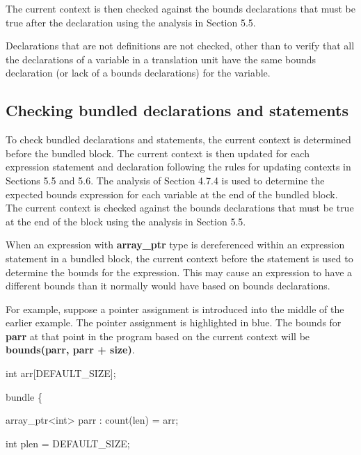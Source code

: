 \documentclass[]{article}
\begin{document}
The current context is then checked against the bounds declarations that
must be true after the declaration using the analysis in Section 5.5.

Declarations that are not definitions are not checked, other than to
verify that all the declarations of a variable in a translation unit
have the same bounds declaration (or lack of a bounds declarations) for
the variable.

\subsection{\texorpdfstring{\protect\hypertarget{ux5fToc426641087}{}{\protect\hypertarget{ux5fToc435434962}{}{\protect\hypertarget{ux5fToc437460790}{}{\protect\hypertarget{ux5fToc440445471}{}{\protect\hypertarget{ux5fToc440449253}{}{\protect\hypertarget{ux5fToc440551903}{}{}}}}}}Checking
bundled declarations and
statements}{Checking bundled declarations and statements}}\label{checking-bundled-declarations-and-statements}

To check bundled declarations and statements, the current context is
determined before the bundled block. The current context is then updated
for each expression statement and declaration following the rules for
updating contexts in Sections 5.5 and 5.6. The analysis of Section 4.7.4
is used to determine the expected bounds expression for each variable at
the end of the bundled block. The current context is checked against the
bounds declarations that must be true at the end of the block using the
analysis in Section 5.5.

When an expression with \textbf{array\_ptr} type is dereferenced within
an expression statement in a bundled block, the current context before
the statement is used to determine the bounds for the expression. This
may cause an expression to have a different bounds than it normally
would have based on bounds declarations.

For example, suppose a pointer assignment is introduced into the middle
of the earlier example. The pointer assignment is highlighted in blue.
The bounds for \textbf{parr} at that point in the program based on the
current context will be \textbf{bounds(parr, parr + size)}.

int arr{[}DEFAULT\_SIZE{]};

bundle \{

array\_ptr\textless{}int\textgreater{} parr : count(len) = arr;

int plen = DEFAULT\_SIZE;
\end{document}
